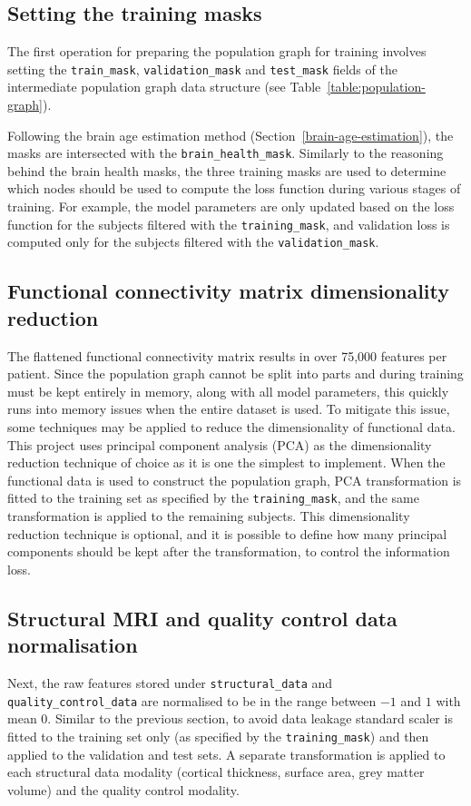 \subsection{Setting the training masks}
\label{setting-training-masks}
The first operation for preparing the population graph for training involves setting the \texttt{train\_mask}, \texttt{validation\_mask} and \texttt{test\_mask} fields of the intermediate population graph data structure (see Table~\ref{table:population-graph}). 

Following the brain age estimation method (Section~\ref{brain-age-estimation}), the masks are intersected with the \texttt{brain\_health\_mask}. Similarly to the reasoning behind the brain health masks, the three training masks are used to determine which nodes should be used to compute the loss function during various stages of training. For example, the model parameters are only updated based on the loss function for the subjects filtered with the \texttt{training\_mask}, and validation loss is computed only for the subjects filtered with the \texttt{validation\_mask}.

\subsection{Functional connectivity matrix dimensionality reduction}
The flattened functional connectivity matrix results in over 75,000 features per patient. Since the population graph cannot be split into parts and during training must be kept entirely in memory, along with all model parameters, this quickly runs into memory issues when the entire dataset is used. To mitigate this issue, some techniques may be applied to reduce the dimensionality of functional data. This project uses principal component analysis (PCA) as the dimensionality reduction technique of choice as it is one the simplest to implement. When the functional data is used to construct the population graph, PCA transformation is fitted to the training set as specified by the \texttt{training\_mask}, and the same transformation is applied to the remaining subjects. This dimensionality reduction technique is optional, and it is possible to define how many principal components should be kept after the transformation, to control the information loss.

\subsection{Structural MRI and quality control data normalisation}
Next, the raw features stored under \texttt{structural\_data} and \texttt{quality\_control\_data} are normalised to be in the range between $-1$ and $1$ with mean 0. Similar to the previous section, to avoid data leakage standard scaler is fitted to the training set only (as specified by the \texttt{training\_mask}) and then applied to the validation and test sets. A separate transformation is applied to each structural data modality (cortical thickness, surface area, grey matter volume) and the quality control modality.


